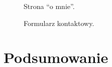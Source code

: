 \documentclass[a4paper, 12pt]{article}
\numberwithin{figure}{section}
\begin{document}
\begin{sloppypar}
\begin{figure}[H] 
    \centering
   \caption{Strona ``o mnie''.}
   \label{fig:gotowa-aplikacja-9.jpg}
\end{figure}

\begin{figure}[H] 
    \centering
   \caption{Formularz kontaktowy.}
   \label{fig:gotowa-aplikacja-10.jpg}
\end{figure}


\newpage 

\section{Podsumowanie}


\newpage 

%
    \listoffigures
    \clearpage


\end{sloppypar}
\end{document}
